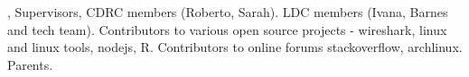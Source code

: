 
, Supervisors, CDRC members (Roberto, Sarah). LDC members (Ivana, Barnes and tech team). Contributors to various open source projects - wireshark, linux and linux tools, nodejs, R. Contributors to online forums stackoverflow, archlinux. Parents. 
